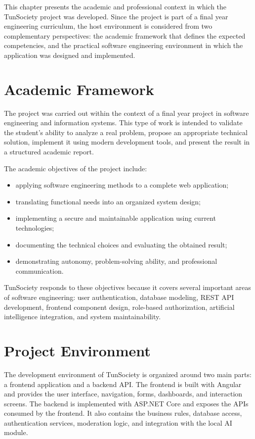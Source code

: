 This chapter presents the academic and professional context in which the TunSociety project was developed. Since the project is part of a final year engineering curriculum, the host environment is considered from two complementary perspectives: the academic framework that defines the expected competencies, and the practical software engineering environment in which the application was designed and implemented.

\section{Academic Framework}

The project was carried out within the context of a final year project in software engineering and information systems. This type of work is intended to validate the student's ability to analyze a real problem, propose an appropriate technical solution, implement it using modern development tools, and present the result in a structured academic report.

The academic objectives of the project include:

\begin{itemize}
    \item applying software engineering methods to a complete web application;
    \item translating functional needs into an organized system design;
    \item implementing a secure and maintainable application using current technologies;
    \item documenting the technical choices and evaluating the obtained result;
    \item demonstrating autonomy, problem-solving ability, and professional communication.
\end{itemize}

TunSociety responds to these objectives because it covers several important areas of software engineering: user authentication, database modeling, REST API development, frontend component design, role-based authorization, artificial intelligence integration, and system maintainability.

\section{Project Environment}

The development environment of TunSociety is organized around two main parts: a frontend application and a backend API. The frontend is built with Angular and provides the user interface, navigation, forms, dashboards, and interaction screens. The backend is implemented with ASP.NET Core and exposes the APIs consumed by the frontend. It also contains the business rules, database access, authentication services, moderation logic, and integration with the local AI module.

